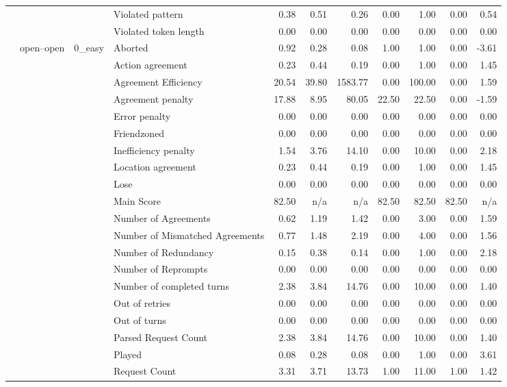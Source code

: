 \begin{tabular}{llllrrrrrrr}
 &  &  & Violated pattern & 0.38 & 0.51 & 0.26 & 0.00 & 1.00 & 0.00 & 0.54 \\
 &  &  & Violated token length & 0.00 & 0.00 & 0.00 & 0.00 & 0.00 & 0.00 & 0.00 \\
\cline{2-11} \cline{3-11}
 & \multirow[t]{216}{*}{open--open} & \multirow[t]{27}{*}{0_easy} & Aborted & 0.92 & 0.28 & 0.08 & 1.00 & 1.00 & 0.00 & -3.61 \\
 &  &  & Action agreement & 0.23 & 0.44 & 0.19 & 0.00 & 1.00 & 0.00 & 1.45 \\
 &  &  & Agreement Efficiency & 20.54 & 39.80 & 1583.77 & 0.00 & 100.00 & 0.00 & 1.59 \\
 &  &  & Agreement penalty & 17.88 & 8.95 & 80.05 & 22.50 & 22.50 & 0.00 & -1.59 \\
 &  &  & Error penalty & 0.00 & 0.00 & 0.00 & 0.00 & 0.00 & 0.00 & 0.00 \\
 &  &  & Friendzoned & 0.00 & 0.00 & 0.00 & 0.00 & 0.00 & 0.00 & 0.00 \\
 &  &  & Inefficiency penalty & 1.54 & 3.76 & 14.10 & 0.00 & 10.00 & 0.00 & 2.18 \\
 &  &  & Location agreement & 0.23 & 0.44 & 0.19 & 0.00 & 1.00 & 0.00 & 1.45 \\
 &  &  & Lose & 0.00 & 0.00 & 0.00 & 0.00 & 0.00 & 0.00 & 0.00 \\
 &  &  & Main Score & 82.50 & n/a & n/a & 82.50 & 82.50 & 82.50 & n/a \\
 &  &  & Number of Agreements & 0.62 & 1.19 & 1.42 & 0.00 & 3.00 & 0.00 & 1.59 \\
 &  &  & Number of Mismatched Agreements & 0.77 & 1.48 & 2.19 & 0.00 & 4.00 & 0.00 & 1.56 \\
 &  &  & Number of Redundancy & 0.15 & 0.38 & 0.14 & 0.00 & 1.00 & 0.00 & 2.18 \\
 &  &  & Number of Reprompts & 0.00 & 0.00 & 0.00 & 0.00 & 0.00 & 0.00 & 0.00 \\
 &  &  & Number of completed turns & 2.38 & 3.84 & 14.76 & 0.00 & 10.00 & 0.00 & 1.40 \\
 &  &  & Out of retries & 0.00 & 0.00 & 0.00 & 0.00 & 0.00 & 0.00 & 0.00 \\
 &  &  & Out of turns & 0.00 & 0.00 & 0.00 & 0.00 & 0.00 & 0.00 & 0.00 \\
 &  &  & Parsed Request Count & 2.38 & 3.84 & 14.76 & 0.00 & 10.00 & 0.00 & 1.40 \\
 &  &  & Played & 0.08 & 0.28 & 0.08 & 0.00 & 1.00 & 0.00 & 3.61 \\
 &  &  & Request Count & 3.31 & 3.71 & 13.73 & 1.00 & 11.00 & 1.00 & 1.42 \\

\end{tabular}

